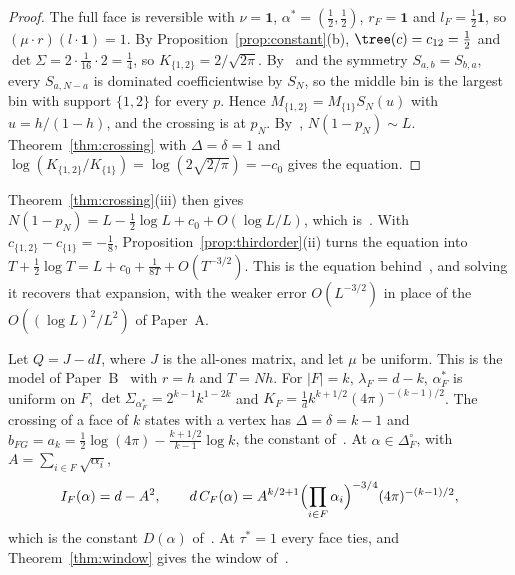 \begin{proof}
The full face is reversible with $\nu=\mathbf 1$, $\alpha^*=(\frac12,\frac12)$,
$r_F=\mathbf 1$ and $l_F=\frac12\mathbf 1$, so $(\mu\cdot r)(l\cdot\mathbf 1)=1$.
By Proposition~\ref{prop:constant}(b), $\tree(c)=c_{12}=\frac12$ and
$\det\Sigma=2\cdot\frac1{16}\cdot2=\frac14$, so
$K_{\{1,2\}}=2/\sqrt{2\pi}$. By~\cite[Prop.~6.1]{paperA} and the symmetry
$S_{a,b}=S_{b,a}$, every $S_{a,N-a}$ is dominated coefficientwise by $S_N$, so
the middle bin is the largest bin with support $\{1,2\}$ for every $p$. Hence
$M_{\{1,2\}}=M_{\{1\}}S_N(u)$ with $u=h/(1-h)$, and the crossing is at $p_N$.
By~\cite[Theorem~5.1]{paperA}, $N(1-p_N)\sim L$. Theorem~\ref{thm:crossing}
with $\Delta=\delta=1$ and $\log(K_{\{1,2\}}/K_{\{1\}})=\log(2\sqrt{2/\pi})=-c_0$
gives the equation.
\end{proof}

Theorem~\ref{thm:crossing}(iii) then gives
$N(1-p_N)=L-\frac12\log L+c_0+O(\log L/L)$, which is~\cite[Eq.~(7)]{paperA}.
With $c_{\{1,2\}}-c_{\{1\}}=-\frac18$, Proposition~\ref{prop:thirdorder}(ii)
turns the equation into $T+\frac12\log T=L+c_0+\frac1{8T}+O(T^{-3/2})$. This
is the equation behind~\cite[Eq.~(8)]{paperA}, and solving it recovers that
expansion, with the weaker error $O(L^{-3/2})$ in place of the
$O((\log L)^2/L^2)$ of Paper~A.

\begin{corollary}[Paper B]\label{cor:paperB}
Let $Q=J-dI$, where $J$ is the all-ones matrix, and let $\mu$ be uniform.
This is the model of Paper~B~\cite{paperB} with $r=h$ and $T=Nh$. For $|F|=k$,
$\lambda_F=d-k$, $\alpha^*_F$ is uniform on $F$,
$\det\Sigma_{\alpha^*_F}=2^{k-1}k^{1-2k}$ and
$K_F=\frac1dk^{k+1/2}(4\pi)^{-(k-1)/2}$. The crossing of a face of $k$ states
with a vertex has $\Delta=\delta=k-1$ and
$b_{FG}=a_k=\frac12\log(4\pi)-\frac{k+1/2}{k-1}\log k$, the constant
of~\cite[Theorem~3.1]{paperB}. At $\alpha\in\Delta_F^\circ$, with
$A=\sum_{i\in F}\sqrt{\alpha_i}$,
\[
I_F(\alpha)=d-A^2,\qquad
d\,C_F(\alpha)=A^{k/2+1}\Bigl(\prod_{i\in F}\alpha_i\Bigr)^{-3/4}(4\pi)^{-(k-1)/2},
\]
which is the constant $D(\alpha)$ of~\cite[Theorem~3.5]{paperB}. At
$\tau^*=1$ every face ties, and Theorem~\ref{thm:window} gives the window
of~\cite[Theorem~3.2]{paperB}.
\end{corollary}

